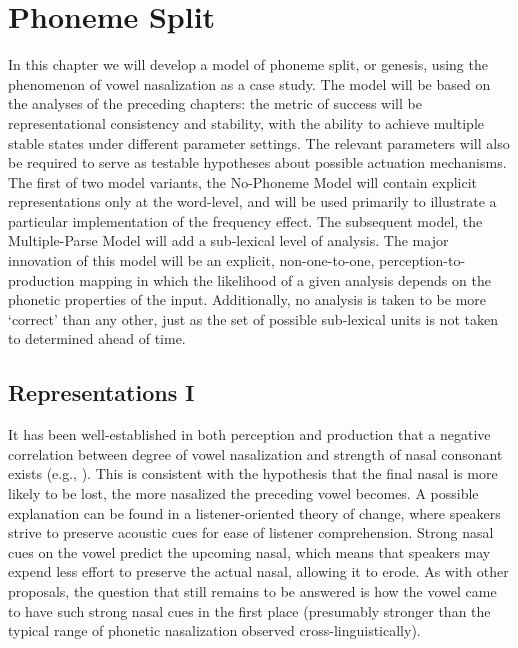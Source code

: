 \chapter{Phoneme Split}\label{ch:Phoneme-Split}

In this chapter we will develop a model of phoneme split, or genesis,
using the phenomenon of vowel nasalization as a case study. The model
will be based on the analyses of the preceding chapters: the metric
of success will be representational consistency and stability, with
the ability to achieve multiple stable states under different parameter
settings. The relevant parameters will also be required to serve as
testable hypotheses about possible actuation mechanisms. The first
of two model variants, the No-Phoneme Model will contain explicit
representations only at the word-level, and will be used primarily
to illustrate a particular implementation of the frequency effect.
The subsequent model, the Multiple-Parse Model will add a sub-lexical
level of analysis. The major innovation of this model will be an explicit,
non-one-to-one, perception-to-production mapping in which the likelihood
of a given analysis depends on the phonetic properties of the input.
Additionally, no analysis is taken to be more `correct' than any other,
just as the set of possible sub-lexical units is not taken to determined
ahead of time.

\section{Representations I}

It has been well-established in both perception and production that
a negative correlation between degree of vowel nasalization and strength
of nasal consonant exists (e.g., \citealt{kawasaki1978perceived,cohn1990phonetic}).
This is consistent with the hypothesis that the final nasal is more
likely to be lost, the more nasalized the preceding vowel becomes.
A possible explanation can be found in a listener-oriented theory
of change, where speakers strive to preserve acoustic cues for ease
of listener comprehension. Strong nasal cues on the vowel predict
the upcoming nasal, which means that speakers may expend less effort
to preserve the actual nasal, allowing it to erode. As with other
proposals, the question that still remains to be answered is how the
vowel came to have such strong nasal cues in the first place (presumably
stronger than the typical range of phonetic nasalization observed
cross-linguistically). 

